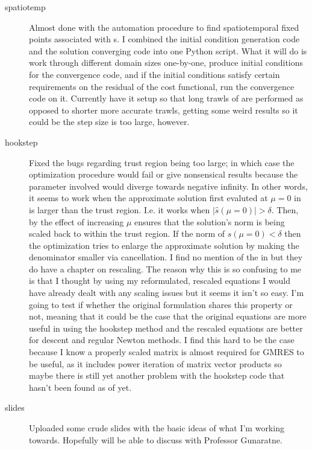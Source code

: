 \begin{description}
{\begin{description}
\item[spatiotemp]
Almost done with the automation procedure to find spatiotemporal fixed points associated
with \ppo s. I combined the initial condition generation code and the solution converging code
into one Python script. What it will do is work through
different domain sizes one-by-one, produce initial conditions for the convergence code, and if
the initial conditions satisfy certain requirements on the residual of the cost functional, run
the convergence code on it. Currently have it setup so that long trawls of {\statesp} are performed
as opposed to shorter more accurate trawls, getting some weird results so it could be the step size
is too large, however.

\item[hookstep]
Fixed the bugs regarding trust region being too large; in which case the optimization procedure
would fail or give nonsensical results because the parameter involved would diverge towards negative
infinity. In other words, it seems to work when the approximate solution first evaluted
at $\mu = 0$ in  is larger than the trust region. I.e. it works when
$|\hat{s}(\mu = 0)| > \delta$. Then, by the effect of increasing $\mu$ ensures that the solution's norm
is being scaled back to within the trust region. If the norm of $s(\mu = 0) < \delta$ then the optimization
tries to enlarge the approximate solution by making the denominator smaller via cancellation. I find no
mention of the in  but they do have a chapter on rescaling. The reason why this is so confusing
to me is that I thought by using my reformulated, rescaled equations I would have already dealt with any scaling
issues but it seems it isn't so easy. I'm going to test if whether the original formulation shares this property
or not, meaning that it could be the case that the original equations are more useful in using the hookstep
method and the rescaled equations are better for descent and regular Newton methods. I find this hard to be
the case because I know a properly scaled matrix is almost required for GMRES to be useful, as it includes
power iteration of matrix vector products so maybe there is still yet another problem with the hookstep code
that hasn't been found as of yet.

\item[slides]
Uploaded some crude slides with the basic ideas of what I'm working towards. Hopefully will be able to discuss
with Professor Gunaratne.

\end{description}
}


\end{description}
